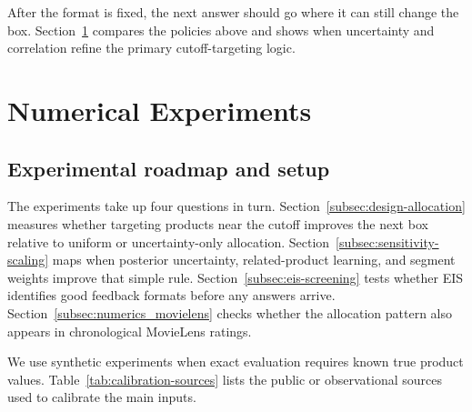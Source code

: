 \documentclass[11pt]{article}
\theoremstyle{definition}
\theoremstyle{remark}
\newcommand{\1}{\mathbf{1}}
\begin{document}
After the format is fixed, the next answer should go where it can
still change the box. Section~\ref{sec:numerics} compares the policies
above and shows when uncertainty and correlation refine the primary
cutoff-targeting logic.

\section{Numerical Experiments}\label{sec:numerics}
\subsection{Experimental roadmap and setup}\label{subsec:setup}

The experiments take up four questions in turn. Section~\ref{subsec:design-allocation} measures whether targeting products near the cutoff improves the next box relative to uniform or uncertainty-only allocation. Section~\ref{subsec:sensitivity-scaling} maps when posterior uncertainty, related-product learning, and segment weights improve that simple rule. Section~\ref{subsec:eis-screening} tests whether EIS identifies good feedback formats before any answers arrive. Section~\ref{subsec:numerics_movielens} checks whether the allocation pattern also appears in chronological MovieLens ratings.

We use synthetic experiments when exact evaluation requires known true
product values. Table~\ref{tab:calibration-sources} lists the public or
observational sources used to calibrate the main inputs.
\end{document}

